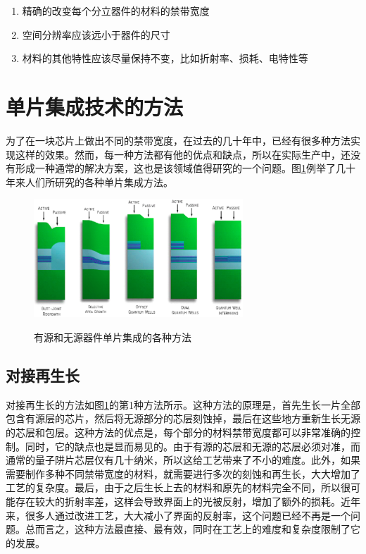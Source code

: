 \documentclass{ZJUthesis}
\begin{document}
\begin{enumerate}
\item{精确的改变每个分立器件的材料的禁带宽度}
\item{空间分辨率应该远小于器件的尺寸}
\item{材料的其他特性应该尽量保持不变，比如折射率、损耗、电特性等}
\end{enumerate}

\section{单片集成技术的方法}

为了在一块芯片上做出不同的禁带宽度，在过去的几十年中，已经有很多种方法实现这样的效果。然而，每一种方法都有他的优点和缺点，所以在实际生产中，还没有形成一种通常的解决方案，这也是该领域值得研究的一个问题。图\ref{fig_pic_methods}例举了几十年来人们所研究的各种单片集成方法。

\begin{figure}[!htb]
  \centering
  \includegraphics[width=0.7\textwidth]{./Pictures/pic_methods.eps}\\
  \caption{有源和无源器件单片集成的各种方法}
  \label{fig_pic_methods}
\end{figure}

\subsection{对接再生长}

对接再生长的方法如图\ref{fig_pic_methods}的第1种方法所示。这种方法的原理是，首先生长一片全部包含有源层的芯片，然后将无源部分的芯层刻蚀掉，最后在这些地方重新生长无源的芯层和包层。这种方法的优点是，每个部分的材料禁带宽度都可以非常准确的控制。同时，它的缺点也是显而易见的。由于有源的芯层和无源的芯层必须对准，而通常的量子阱片芯层仅有几十纳米，所以这给工艺带来了不小的难度。此外，如果需要制作多种不同禁带宽度的材料，就需要进行多次的刻蚀和再生长，大大增加了工艺的复杂度。最后，由于之后生长上去的材料和原先的材料完全不同，所以很可能存在较大的折射率差，这样会导致界面上的光被反射，增加了额外的损耗。近年来，很多人通过改进工艺，大大减小了界面的反射率，这个问题已经不再是一个问题。总而言之，这种方法最直接、最有效，同时在工艺上的难度和复杂度限制了它的发展。
\end{document}
